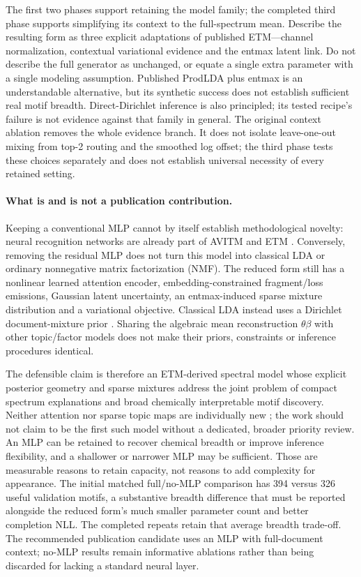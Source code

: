 \documentclass[10pt,a4paper]{article}
\begin{document}
The first two phases support retaining the model family; the completed third
phase supports simplifying its context to the full-spectrum mean. Describe
the resulting form as three explicit adaptations of published ETM---channel
normalization, contextual variational evidence and the entmax latent link.
Do not describe the full generator as unchanged, or equate a single extra
parameter with a single modeling assumption. Published ProdLDA plus entmax
is an understandable alternative, but its synthetic success does not establish
sufficient real motif breadth. Direct-Dirichlet inference is also principled;
its tested recipe's failure is not evidence against that family in general.
The original context ablation removes the whole evidence branch. It does not
isolate leave-one-out mixing from top-2 routing and the smoothed log offset;
the third phase tests these choices separately and does not establish universal
necessity of every retained setting.

\paragraph{What is and is not a publication contribution.}
Keeping a conventional MLP cannot by itself establish methodological novelty:
neural recognition networks are already part of AVITM and ETM
\cite{srivastava2017,dieng2020}. Conversely, removing the residual MLP does not
turn this model into classical LDA or ordinary nonnegative matrix factorization
(NMF). The reduced form still has a nonlinear learned attention encoder,
embedding-constrained fragment/loss emissions, Gaussian latent uncertainty,
an entmax-induced sparse mixture distribution and a variational objective.
Classical LDA instead uses a Dirichlet document-mixture prior
\cite{blei2003}. Sharing the algebraic mean reconstruction $\theta\beta$ with
other topic/factor models does not make their priors, constraints or inference
procedures identical.

The defensible claim is therefore an ETM-derived spectral model whose explicit
posterior geometry and sparse mixtures address the joint problem of compact
spectrum explanations and broad chemically interpretable motif discovery.
Neither attention nor sparse topic maps are individually new
\cite{panwar2021,lin2019}; the work should not claim to be the first such model
without a dedicated, broader priority review. An MLP can be retained to recover
chemical breadth or improve inference flexibility, and a shallower or narrower
MLP may be sufficient. Those are measurable reasons to retain capacity, not
reasons to add complexity for appearance. The initial matched full/no-MLP
comparison has 394 versus 326 useful validation motifs, a substantive breadth
difference that must be reported alongside the reduced form's much smaller
parameter count and better completion NLL. The completed repeats retain that
average breadth trade-off. The recommended publication candidate uses an MLP
with full-document context; no-MLP results remain informative ablations rather than being
discarded for lacking a standard neural layer.
\end{document}
